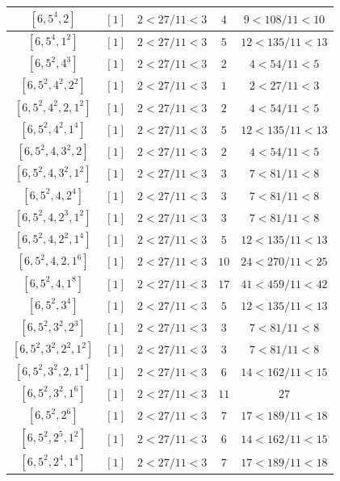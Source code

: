 \documentclass{article}%
\begin{document}
\begin{center}
\begin{longtable}{||c|c|c|c|c||}
$[6, 5^{4}, 2]$ & $[1]$ & $2 < 27/11 < 3$ & $4$ & $9 < 108/11 < 10$ \\ \hline 
$[6, 5^{4}, 1^{2}]$ & $[1]$ & $2 < 27/11 < 3$ & $5$ & $12 < 135/11 < 13$ \\ \hline 
$[6, 5^{2}, 4^{3}]$ & $[1]$ & $2 < 27/11 < 3$ & $2$ & $4 < 54/11 < 5$ \\ \hline 
$[6, 5^{2}, 4^{2}, 2^{2}]$ & $[1]$ & $2 < 27/11 < 3$ & $1$ & $2 < 27/11 < 3$ \\ \hline 
$[6, 5^{2}, 4^{2}, 2, 1^{2}]$ & $[1]$ & $2 < 27/11 < 3$ & $2$ & $4 < 54/11 < 5$ \\ \hline 
$[6, 5^{2}, 4^{2}, 1^{4}]$ & $[1]$ & $2 < 27/11 < 3$ & $5$ & $12 < 135/11 < 13$ \\ \hline 
$[6, 5^{2}, 4, 3^{2}, 2]$ & $[1]$ & $2 < 27/11 < 3$ & $2$ & $4 < 54/11 < 5$ \\ \hline 
$[6, 5^{2}, 4, 3^{2}, 1^{2}]$ & $[1]$ & $2 < 27/11 < 3$ & $3$ & $7 < 81/11 < 8$ \\ \hline 
$[6, 5^{2}, 4, 2^{4}]$ & $[1]$ & $2 < 27/11 < 3$ & $3$ & $7 < 81/11 < 8$ \\ \hline 
$[6, 5^{2}, 4, 2^{3}, 1^{2}]$ & $[1]$ & $2 < 27/11 < 3$ & $3$ & $7 < 81/11 < 8$ \\ \hline 
$[6, 5^{2}, 4, 2^{2}, 1^{4}]$ & $[1]$ & $2 < 27/11 < 3$ & $5$ & $12 < 135/11 < 13$ \\ \hline 
$[6, 5^{2}, 4, 2, 1^{6}]$ & $[1]$ & $2 < 27/11 < 3$ & $10$ & $24 < 270/11 < 25$ \\ \hline 
$[6, 5^{2}, 4, 1^{8}]$ & $[1]$ & $2 < 27/11 < 3$ & $17$ & $41 < 459/11 < 42$ \\ \hline 
$[6, 5^{2}, 3^{4}]$ & $[1]$ & $2 < 27/11 < 3$ & $5$ & $12 < 135/11 < 13$ \\ \hline 
$[6, 5^{2}, 3^{2}, 2^{3}]$ & $[1]$ & $2 < 27/11 < 3$ & $3$ & $7 < 81/11 < 8$ \\ \hline 
$[6, 5^{2}, 3^{2}, 2^{2}, 1^{2}]$ & $[1]$ & $2 < 27/11 < 3$ & $3$ & $7 < 81/11 < 8$ \\ \hline 
$[6, 5^{2}, 3^{2}, 2, 1^{4}]$ & $[1]$ & $2 < 27/11 < 3$ & $6$ & $14 < 162/11 < 15$ \\ \hline 
$[6, 5^{2}, 3^{2}, 1^{6}]$ & $[1]$ & $2 < 27/11 < 3$ & $11$ & $27$ \\ \hline 
$[6, 5^{2}, 2^{6}]$ & $[1]$ & $2 < 27/11 < 3$ & $7$ & $17 < 189/11 < 18$ \\ \hline 
$[6, 5^{2}, 2^{5}, 1^{2}]$ & $[1]$ & $2 < 27/11 < 3$ & $6$ & $14 < 162/11 < 15$ \\ \hline 
$[6, 5^{2}, 2^{4}, 1^{4}]$ & $[1]$ & $2 < 27/11 < 3$ & $7$ & $17 < 189/11 < 18$ \\ \hline 

\end{longtable}
\end{center}
\end{document}
